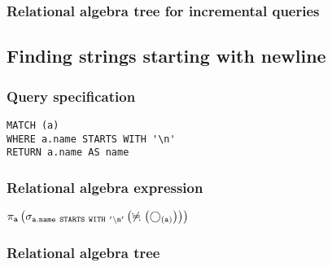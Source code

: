 \subsubsection*{Relational algebra tree for incremental queries}


\subsection{Finding strings starting with newline}

\subsubsection*{Query specification}

\begin{lstlisting}
MATCH (a)
WHERE a.name STARTS WITH '\n'
RETURN a.name AS name
\end{lstlisting}

\subsubsection*{Relational algebra expression}

$\projection{\var{a}} \left(\selection{\mathtt{a.name~STARTS~WITH~'\backslash{}n'}} \left(\alldifferent{} \left(\getvertices{a}{}\right)\right)\right)$

\subsubsection*{Relational algebra tree}


